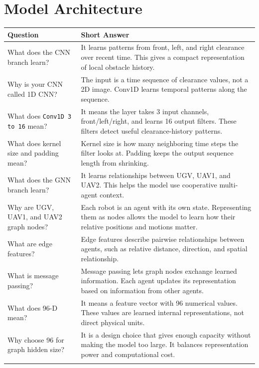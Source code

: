 \documentclass[11pt,a4paper]{article}
\begin{document}
\section*{Model Architecture}
\begin{longtable}{QA}
\toprule
\textbf{Question} & \textbf{Short Answer} \\
\midrule
\endhead
What does the CNN branch learn? &
It learns patterns from front, left, and right clearance over recent time. This gives a compact representation of local obstacle history. \\
\addlinespace
Why is your CNN called 1D CNN? &
The input is a time sequence of clearance values, not a 2D image. Conv1D learns temporal patterns along the sequence. \\
\addlinespace
What does \texttt{Conv1D 3 to 16} mean? &
It means the layer takes 3 input channels, front/left/right, and learns 16 output filters. These filters detect useful clearance-history patterns. \\
\addlinespace
What does kernel size and padding mean? &
Kernel size is how many neighboring time steps the filter looks at. Padding keeps the output sequence length from shrinking. \\
\addlinespace
What does the GNN branch learn? &
It learns relationships between UGV, UAV1, and UAV2. This helps the model use cooperative multi-agent context. \\
\addlinespace
Why are UGV, UAV1, and UAV2 graph nodes? &
Each robot is an agent with its own state. Representing them as nodes allows the model to learn how their relative positions and motions matter. \\
\addlinespace
What are edge features? &
Edge features describe pairwise relationships between agents, such as relative distance, direction, and spatial relationship. \\
\addlinespace
What is message passing? &
Message passing lets graph nodes exchange learned information. Each agent updates its representation based on information from other agents. \\
\addlinespace
What does 96-D mean? &
It means a feature vector with 96 numerical values. These values are learned internal representations, not direct physical units. \\
\addlinespace
Why choose 96 for graph hidden size? &
It is a design choice that gives enough capacity without making the model too large. It balances representation power and computational cost. \\
\addlinespace

\end{longtable}
\end{document}
